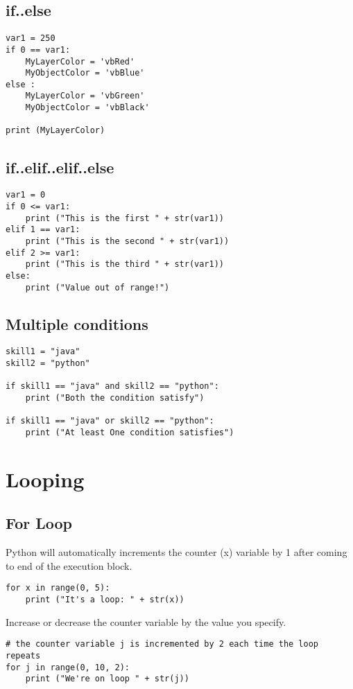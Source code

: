 \documentclass[a4paper,9pt]{extarticle}
\begin{document}
\begin{multicols*}{2}
\subsection{if..else}
\begin{lstlisting}
var1 = 250
if 0 == var1:
    MyLayerColor = 'vbRed'
    MyObjectColor = 'vbBlue'
else :
    MyLayerColor = 'vbGreen'
    MyObjectColor = 'vbBlack'

print (MyLayerColor)
\end{lstlisting}

\subsection{if..elif..elif..else}
\begin{lstlisting}
var1 = 0
if 0 <= var1:
    print ("This is the first " + str(var1))
elif 1 == var1:
    print ("This is the second " + str(var1))
elif 2 >= var1:
    print ("This is the third " + str(var1))
else:
    print ("Value out of range!")
\end{lstlisting}

\subsection{Multiple conditions}
\begin{lstlisting}
skill1 = "java"
skill2 = "python"

if skill1 == "java" and skill2 == "python":
    print ("Both the condition satisfy")

if skill1 == "java" or skill2 == "python":
    print ("At least One condition satisfies")

\end{lstlisting}


\section{Looping}

\subsection{For Loop}
Python will automatically increments the counter (x) variable by 1 after coming to end of the execution block.
\begin{lstlisting}
for x in range(0, 5):
    print ("It's a loop: " + str(x))
\end{lstlisting}

Increase or decrease the counter variable by the value you specify.
\begin{lstlisting}
# the counter variable j is incremented by 2 each time the loop repeats
for j in range(0, 10, 2):
    print ("We're on loop " + str(j))


\end{lstlisting}
\end{multicols*}
\end{document}
